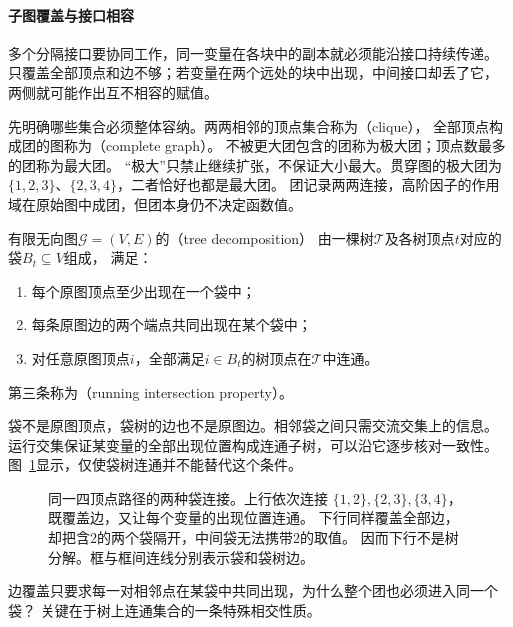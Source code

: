 \paragraph{子图覆盖与接口相容}

多个分隔接口要协同工作，同一变量在各块中的副本就必须能沿接口持续传递。
只覆盖全部顶点和边不够；若变量在两个远处的块中出现，中间接口却丢了它，
两侧就可能作出互不相容的赋值。

先明确哪些集合必须整体容纳。两两相邻的顶点集合称为（clique），
全部顶点构成团的图称为（complete graph）。
不被更大团包含的团称为极大团；顶点数最多的团称为最大团。
“极大”只禁止继续扩张，不保证大小最大。贯穿图的极大团为
\(\{1,2,3\}\)、\(\{2,3,4\}\)，二者恰好也都是最大团。
团记录两两连接，高阶因子的作用域在原始图中成团，但团本身仍不决定函数值。

\begin{definition}[树分解]
  \label{def:graph-theory-tree-decomposition}
  有限无向图\(\mathcal G=(V,E)\)的（tree decomposition）
  由一棵树\(\mathcal T\)及各树顶点\(t\)对应的袋\(B_t\subseteq V\)组成，
  满足：
  \begin{enumerate}
    \item 每个原图顶点至少出现在一个袋中；
    \item 每条原图边的两个端点共同出现在某个袋中；
    \item 对任意原图顶点\(i\)，全部满足\(i\in B_t\)的树顶点在\(\mathcal T\)中连通。
  \end{enumerate}
  第三条称为（running intersection property）。
\end{definition}

袋不是原图顶点，袋树的边也不是原图边。相邻袋之间只需交流交集上的信息。
运行交集保证某变量的全部出现位置构成连通子树，可以沿它逐步核对一致性。
图~\ref{fig:graph-theory-running-intersection}显示，仅使袋树连通并不能替代这个条件。

\begin{figure}[htbp]
  \centering
  
  \caption{同一四顶点路径的两种袋连接。上行依次连接
  \(\{1,2\},\{2,3\},\{3,4\}\)，既覆盖边，又让每个变量的出现位置连通。
  下行同样覆盖全部边，却把含\(2\)的两个袋隔开，中间袋无法携带\(2\)的取值。
  因而下行不是树分解。框与框间连线分别表示袋和袋树边。}
  \label{fig:graph-theory-running-intersection}
\end{figure}

边覆盖只要求每一对相邻点在某袋中共同出现，为什么整个团也必须进入同一个袋？
关键在于树上连通集合的一条特殊相交性质。

